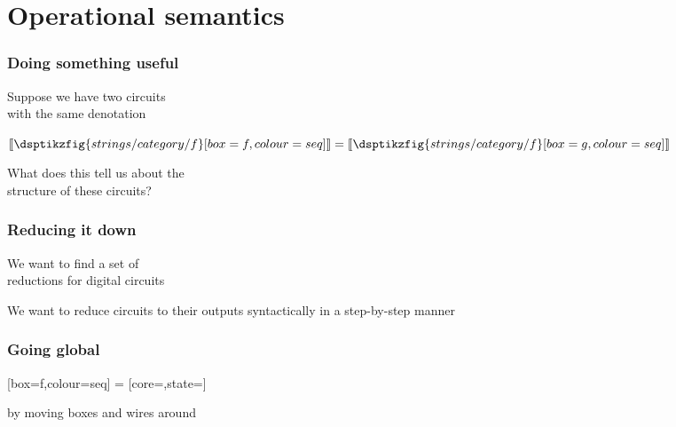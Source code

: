 \section{Operational semantics}

\begin{frame}
    \frametitle{Doing something useful}

    \centering

    \LARGE
    Suppose we have two circuits \\
    with the same denotation
    \normalsize

    \vspace{2em}

    \(
    \left\llbracket\dsptikzfig{strings/category/f}[box=f,colour=seq]\right\rrbracket
    =
    \left\llbracket\dsptikzfig{strings/category/f}[box=g,colour=seq]\right\rrbracket
    \)

    \vspace{2em}

    \LARGE
    \await
    What does this tell us about the \\
    \alert{structure} of these circuits?

\end{frame}
\begin{frame}
    \frametitle{Reducing it down}

    \centering
    \LARGE

    We want to find a set of \\ \alert{reductions} for digital circuits


    \await
    We want to reduce circuits to their outputs \alert{syntactically}
    in a \alert{step-by-step} manner

\end{frame}
\begin{frame}
    \frametitle{Going global}

    \centering

    [box=f,colour=seq]
    \await
    \Large=\normalsize
    [core=,state=]

    \vspace{1em}
    \Large
    by moving boxes and wires around
\end{frame}

